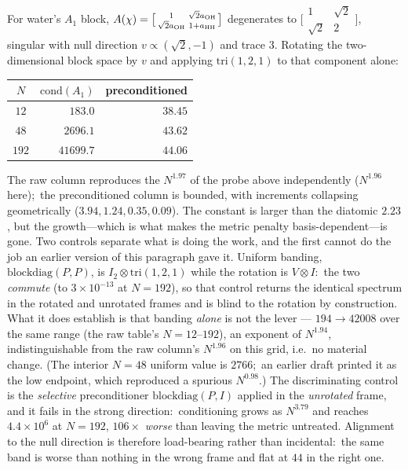 \documentclass[aps,pra,twocolumn,superscriptaddress,longbibliography]{revtex4-2}
\newcommand{\gvq}[2]{#2}
\begin{document}
For water's $A_1$ block, $A(\chi)=\bigl[\begin{smallmatrix}1&\sqrt2 a_{\rm OH}\\
\sqrt2 a_{\rm OH}&1+a_{\rm HH}\end{smallmatrix}\bigr]$ degenerates to
$\bigl[\begin{smallmatrix}1&\sqrt2\\\sqrt2&2\end{smallmatrix}\bigr]$, singular
with null direction $v\propto(\sqrt2,-1)$ and trace $3$.  Rotating the
two-dimensional block space by $v$ and applying $\mathrm{tri}(1,2,1)$ to that
component alone:
\begin{center}
\begin{tabular}{crr}
\toprule
$N$ & $\mathrm{cond}(A_1)$ & preconditioned\\
\midrule
$12$  & $183.0$    & $38.45$\\
$48$  & $2696.1$   & $43.62$\\
$192$ & $41699.7$  & $\mathbf{44.06}$\\
\bottomrule
\end{tabular}
\end{center}
The raw column reproduces the $N^{1.97}$ of the probe above independently
($N^{\gvq{p60_water_a1_exponent}{1.96}}$ here);\ the preconditioned column is bounded, with increments
collapsing geometrically ($3.94,1.24,0.35,0.09$).  The constant is larger than
the diatomic $2.23$, but the growth---which is what makes the metric penalty
basis-dependent---is gone.  Two controls separate what is doing the work, and the first cannot do the
job an earlier version of this paragraph gave it.  Uniform banding,
$\mathrm{blockdiag}(P,P)$, is $I_2\otimes\mathrm{tri}(1,2,1)$ while the
rotation is $V\otimes I$:\ the two \emph{commute} (to $3\times10^{-13}$ at
$N=192$), so that control returns the identical spectrum in the rotated and
unrotated frames and is blind to the rotation by construction.  What it does
establish is that banding \emph{alone} is not the lever --- $194\to42008$
over the same range (the raw table's $N=12$--$192$), an exponent of $N^{1.94}$,
indistinguishable from the raw column's $N^{1.96}$ on this grid, i.e.\ no
material change.  (The interior $N=48$ uniform value is $2766$;\ an earlier
draft printed it as the low endpoint, which reproduced a spurious $N^{0.98}$.)  The discriminating control is the
\emph{selective} preconditioner $\mathrm{blockdiag}(P,I)$ applied in the
\emph{unrotated} frame, and it fails in the strong direction:\ conditioning
grows as $N^{3.79}$ and reaches $4.4\times10^{6}$ at $N=192$, $106\times$
\emph{worse} than leaving the metric untreated.  Alignment to the null
direction is therefore load-bearing rather than incidental:\ the same band is
worse than nothing in the wrong frame and flat at $44$ in the right one.
\end{document}
